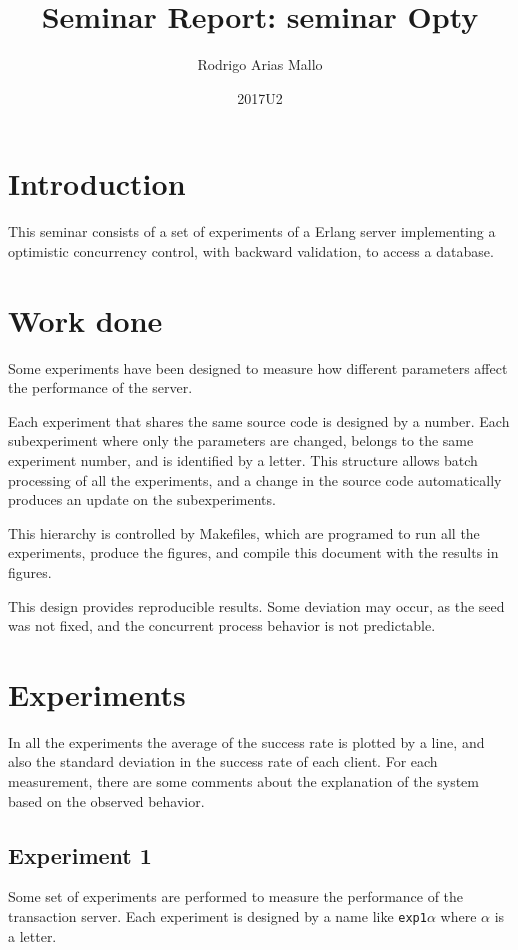 \documentclass[a4paper, 11pt]{article}
\title{Seminar Report: seminar Opty}
\author{Rodrigo Arias Mallo}
\date{2017U2}
\begin{document}
\maketitle

\section{Introduction}

This seminar consists of a set of experiments of a Erlang server implementing a 
optimistic concurrency control, with backward validation, to access a database. 

\section{Work done}

Some experiments have been designed to measure how different parameters affect 
the performance of the server.

Each experiment that shares the same source code is designed by a number. Each 
subexperiment where only the parameters are changed, belongs to the same 
experiment number, and is identified by a letter. This structure allows batch 
processing of all the experiments, and a change in the source code automatically 
produces an update on the subexperiments.

This hierarchy is controlled by Makefiles, which are programed to run all the 
experiments, produce the figures, and compile this document with the results in 
figures.

This design provides reproducible results. Some deviation may occur, as the seed 
was not fixed, and the concurrent process behavior is not predictable.

\newpage
\section{Experiments}

In all the experiments the average of the success rate is plotted by a line, and 
also the standard deviation in the success rate of each client. For each 
measurement, there are some comments about the explanation of the system based 
on the observed behavior.

\subsection{Experiment 1}

Some set of experiments are performed to measure the performance of the 
transaction server. Each experiment is designed by a name like 
\texttt{exp1$\alpha$} where $\alpha$ is a letter.
\end{document}
